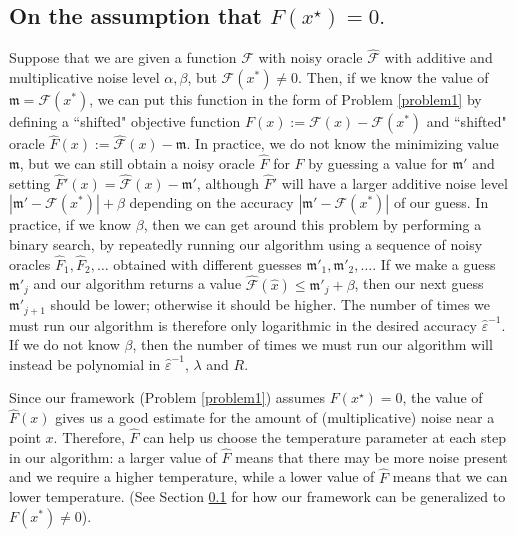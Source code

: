 \documentclass[final,12pt]{colt2018} %
\renewcommand{\epsilon}{\varepsilon}
\begin{document}
{\subsection{On the assumption that $F(x^\star)=0.$}\label{rem:binarysearch}


Suppose that we are given a function $\mathcal{F}$ with noisy oracle $\hat{\mathcal{F}}$ with additive and multiplicative noise level $\alpha, \beta$, but $\mathcal{F}(x^{*}) \neq 0$.  Then, if we know the value of $\mathfrak{m}=\mathcal{F}(x^{*})$, we can put this function in the form of Problem \ref{problem1} by defining a ``shifted" objective function $F(x) := \mathcal{F}(x) - \mathcal{F}(x^{*})$ and ``shifted" oracle $\hat{F}(x) := \hat{\mathcal{F}}(x) - \mathfrak{m}$.  In practice, we do not know the minimizing value $\mathfrak{m}$, but we can still obtain a noisy oracle $\hat{F}$ for $F$ by guessing a value for $\mathfrak{m}'$ and setting $\hat{F}'(x) =\hat{\mathcal{F}}(x) - \mathfrak{m}'$, although $\hat{F}'$ will have a larger additive noise level $|\mathfrak{m}' - \mathcal{F}(x^{*})| + \beta$  depending on the accuracy $|\mathfrak{m}' - \mathcal{F}(x^{*})|$ of our guess.   In practice, if we know $\beta$, then we can get around this problem by performing a binary search, by repeatedly running our algorithm using a sequence of noisy oracles $\hat{F}_1, \hat{F}_2, \ldots$ obtained with different guesses $\mathfrak{m}'_1, \mathfrak{m}'_2, \ldots$.  If we make a guess $\mathfrak{m}'_j$ and our algorithm returns a value $\hat{\mathcal{F}}(\hat{x}) \leq \mathfrak{m}'_j + \beta$, then our next guess $\mathfrak{m}'_{j+1}$ should be lower; otherwise it should be higher.  The number of times we must run our algorithm is therefore only logarithmic in the desired accuracy $\hat{\epsilon}^{-1}$.  If we do not know $\beta$, then the number of times we must run our algorithm will instead be polynomial in $\hat{\epsilon}^{-1}$, $\lambda$ and $R$.

%
Since our framework (Problem \ref{problem1}) assumes $F(x^{\star}) = 0$, the value of $\hat{F}(x)$ gives us a good estimate for the amount of (multiplicative) noise near a point $x$.  Therefore, $\hat{F}$ can help us choose the temperature parameter at each step in our algorithm: a larger value of $\hat{F}$ means that there may be more noise present and we require a higher temperature, while a lower value of $\hat{F}$ means that we can lower temperature.  (See Section \ref{rem:binarysearch} for how our framework can be generalized to $F(x^{*}) \neq 0$).


}
\end{document}
